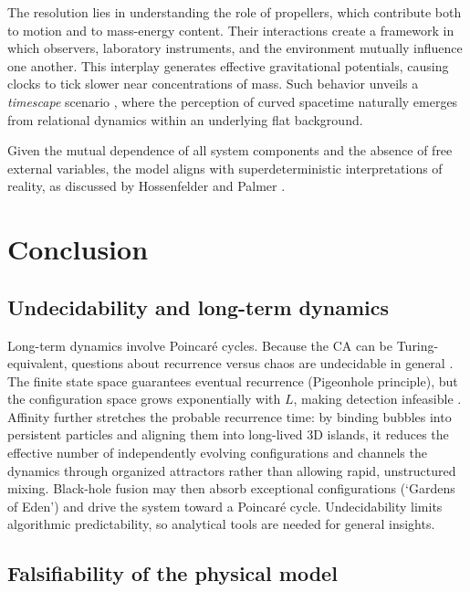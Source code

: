 \documentclass{ijuc}
\begin{document}
The resolution lies in understanding the role of propellers, which contribute both to motion and to mass-energy content. 
Their interactions create a framework in which observers, laboratory instruments, and the environment mutually influence one another. 
This interplay generates effective gravitational potentials, causing clocks to tick slower near concentrations of mass. 
Such behavior unveils a \textit{timescape} scenario \cite{duley2013timescape}, where the perception of curved spacetime naturally emerges from relational dynamics within an underlying flat background.


Given the mutual dependence of all system components and the absence of free external variables, the model aligns with superdeterministic interpretations of reality, as discussed by Hossenfelder and Palmer \cite{hossenfelder2020rethinking}.


\section{Conclusion\label{sec:Discussion}}

\subsection{Undecidability and long-term dynamics}\label{sec-undecidability}

Long-term dynamics involve Poincaré cycles. Because the CA can be Turing-equivalent, questions about recurrence versus chaos are undecidable in general \cite{wolfram1983,gacs1979}. The finite state space guarantees eventual recurrence (Pigeonhole principle), but the configuration space grows exponentially with $L$, making detection infeasible \cite{bernstein2007,toffoli1980}. Affinity further stretches the probable recurrence time: by binding bubbles into persistent particles and aligning them into long-lived 3D islands, it reduces the effective number of independently evolving configurations and channels the dynamics through organized attractors rather than allowing rapid, unstructured mixing. Black-hole fusion may then absorb exceptional configurations (`Gardens of Eden') and drive the system toward a Poincaré cycle. Undecidability limits algorithmic predictability, so analytical tools are needed for general insights.

\subsection{Falsifiability of the physical model}
\end{document}
